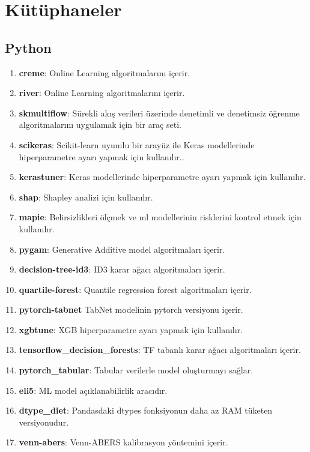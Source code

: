 \section{Kütüphaneler}

\subsection{Python}
\begin{enumerate}
    \item \textbf{creme}: Online Learning algoritmalarını içerir.
    \item \textbf{river}: Online Learning algoritmalarını içerir.
    \item \textbf{skmultiflow}: Sürekli akış verileri üzerinde denetimli ve denetimsiz öğrenme algoritmalarını uygulamak için bir araç seti.
    \item \textbf{scikeras}: Scikit-learn uyumlu bir arayüz ile Keras modellerinde hiperparametre ayarı yapmak için kullanılır..
    \item \textbf{kerastuner}: Keras modellerinde hiperparametre ayarı yapmak için kullanılır.
    \item \textbf{shap}: Shapley analizi için kullanılır.
    \item \textbf{mapie}: Belirsizlikleri ölçmek ve ml modellerinin risklerini kontrol etmek için kullanılır.
    \item \textbf{pygam}: Generative Additive model algoritmaları içerir.
    \item \textbf{decision-tree-id3}: ID3 karar ağacı algoritmaları içerir.
    \item \textbf{quartile-forest}: Quantile regression forest algoritmaları içerir.
    \item \textbf{pytorch-tabnet} TabNet modelinin pytorch versiyonu içerir.
    \item \textbf{xgbtune}: XGB hiperparametre ayarı yapmak için kullanılır.
    \item \textbf{tensorflow\_decision\_forests}: TF tabanlı karar ağacı algoritmaları içerir.
    \item \textbf{pytorch\_tabular}: Tabular verilerle model oluşturmayı sağlar.
    \item \textbf{eli5}: ML model açıklanabilirlik aracıdır.
    \item \textbf{dtype\_diet}: Pandasdaki dtypes fonksiyonun daha az RAM tüketen versiyonudur.
    \item \textbf{venn-abers}: Venn-ABERS kalibrasyon yöntemini içerir.

\end{enumerate}
